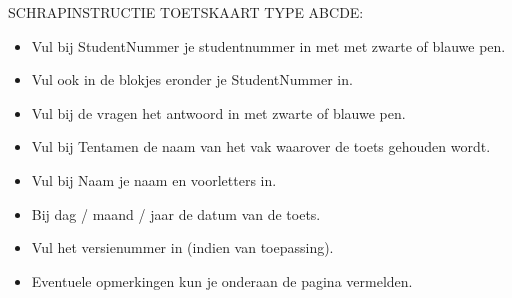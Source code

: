 \documentclass[a4paper,12pt,fleqn,dutch,mimicwordtwentyten]{tisdexam}
\begin{document}
\ifprintanswers\else\hypersetup{linkcolor=black}\fi


\makecoverpage

	\begin{minipage}[c]{0.979\linewidth}
	{\fontsize{11pt}{12pt}\selectfont\bfseries
	{\addtolength{\leftskip}{6mm} SCHRAPINSTRUCTIE TOETSKAART TYPE ABCDE: \par}
	\par}%

	{\fontsize{11pt}{12pt}\selectfont
		\begin{itemize}\itemsep-4pt
			\item Vul bij StudentNummer je studentnummer in met met zwarte of blauwe pen.
			\item Vul ook in de blokjes eronder je StudentNummer in.
			\item Vul bij de vragen het antwoord in met zwarte of blauwe pen.
			\item Vul bij Tentamen de naam van het vak waarover de toets gehouden wordt.
			\item Vul bij Naam je naam en voorletters in.
			\item Bij dag / maand / jaar de datum van de toets.
			\item Vul het versienummer in (indien van toepassing).
			\item Eventuele opmerkingen kun je onderaan de pagina vermelden.
		\end{itemize}
		\vskip 1.0cm
	\par}%
	\end{minipage}\hfill
\end{document}
